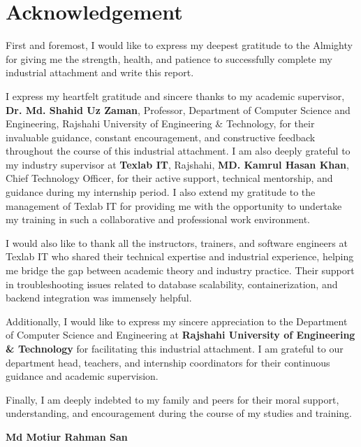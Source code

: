 \chapter*{Acknowledgement}

First and foremost, I would like to express my deepest gratitude to the Almighty for giving me the strength, health, and patience to successfully complete my industrial attachment and write this report.

I express my heartfelt gratitude and sincere thanks to my academic supervisor, \textbf{Dr. Md. Shahid Uz Zaman}, Professor, Department of Computer Science and Engineering, Rajshahi University of Engineering \& Technology, for their invaluable guidance, constant encouragement, and constructive feedback throughout the course of this industrial attachment. I am also deeply grateful to my industry supervisor at \textbf{Texlab IT}, Rajshahi, \textbf{MD. Kamrul Hasan Khan}, Chief Technology Officer, for their active support, technical mentorship, and guidance during my internship period. I also extend my gratitude to the management of Texlab IT for providing me with the opportunity to undertake my training in such a collaborative and professional work environment.

I would also like to thank all the instructors, trainers, and software engineers at Texlab IT who shared their technical expertise and industrial experience, helping me bridge the gap between academic theory and industry practice. Their support in troubleshooting issues related to database scalability, containerization, and backend integration was immensely helpful.

Additionally, I would like to express my sincere appreciation to the Department of Computer Science and Engineering at \textbf{Rajshahi University of Engineering & Technology} for facilitating this industrial attachment. I am grateful to our department head, teachers, and internship coordinators for their continuous guidance and academic supervision.

Finally, I am deeply indebted to my family and peers for their moral support, understanding, and encouragement during the course of my studies and training.

\vspace{1.5cm}

\noindent
\textbf{Md Motiur Rahman San}
